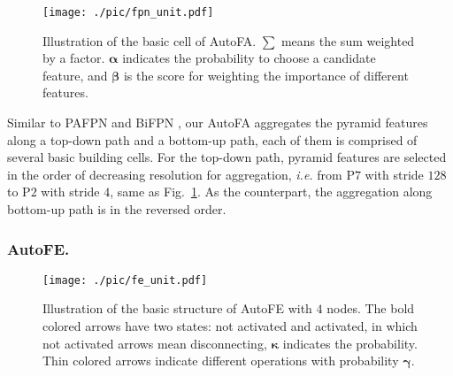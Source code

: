 \documentclass[sigconf]{acmart}
\begin{document}
\begin{figure}[!t]
    \centering
    \texttt{[image: ./pic/fpn\_unit.pdf]}
    \caption{Illustration of the basic cell of AutoFA. $\sum$ means the sum weighted by a factor. $\boldsymbol{\alpha}$ indicates the probability to choose a candidate feature, and $\boldsymbol{\beta}$ is the score for weighting the importance of different features.}
    \label{fig:fpn_uint}
\end{figure}

Similar to PAFPN \cite{liu2018pafpn} and BiFPN \cite{tan2020efficientdet}, our AutoFA aggregates the pyramid features along a top-down path and a bottom-up path, each of them is comprised of several basic building cells. For the top-down path, pyramid features are selected in the order of decreasing resolution for aggregation, \textit{i.e.} from P$7$ with stride $128$ to P$2$ with stride $4$, same as Fig.~\ref{fig:fpn_uint}. As the counterpart, the aggregation along bottom-up path is in the reversed order.

\subsubsection{AutoFE.}
\begin{figure}[!t]
    \centering
    \texttt{[image: ./pic/fe\_unit.pdf]}
    \caption{Illustration of the basic structure of AutoFE with $4$ nodes. The bold colored arrows have two states: not activated and activated, in which not activated arrows mean disconnecting, $\boldsymbol{\kappa}$ indicates the probability. Thin colored arrows indicate different operations with probability $\boldsymbol{\gamma}$.}
    \label{fig:fe_uint}
\end{figure}
\end{document}
